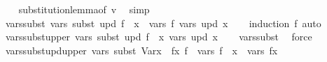 \begin{isabellebody}
%
\isadelimproof
\ \ %
\endisadelimproof
%
\isatagproof
{}\isamarkupfalse%
\ substitution{\isacharunderscore}{\kern0pt}lemma{\isacharbrackleft}{\kern0pt}of\ v{\isacharbrackright}{\kern0pt}\ \isamarkupfalse%
\ simp%
\endisatagproof
{\isafoldproof}%
%
\isadelimproof
\isanewline
%
\endisadelimproof
\isanewline
\isanewline
{}\isamarkupfalse%
\ vars{\isacharunderscore}{\kern0pt}subst{\isacharcolon}{\kern0pt}\ {\isachardoublequoteopen}vars\ {\isacharparenleft}{\kern0pt}subst\ upd\ f{\isacharparenright}{\kern0pt}\ {\isacharequal}{\kern0pt}\ {\isacharparenleft}{\kern0pt}{\isasymUnion}x\ {\isasymin}\ vars\ f{\isachardot}{\kern0pt}\ vars\ {\isacharparenleft}{\kern0pt}upd\ x{\isacharparenright}{\kern0pt}{\isacharparenright}{\kern0pt}{\isachardoublequoteclose}\isanewline
%
\isadelimproof
\ \ %
\endisadelimproof
%
\isatagproof
{}\isamarkupfalse%
\ {\isacharparenleft}{\kern0pt}induction\ f{\isacharparenright}{\kern0pt}\ auto%
\endisatagproof
{\isafoldproof}%
%
\isadelimproof
\isanewline
%
\endisadelimproof
\isanewline
{}\isamarkupfalse%
\ vars{\isacharunderscore}{\kern0pt}subst{\isacharunderscore}{\kern0pt}upper{\isacharcolon}{\kern0pt}\ {\isachardoublequoteopen}vars\ {\isacharparenleft}{\kern0pt}subst\ upd\ f{\isacharparenright}{\kern0pt}\ {\isasymsubseteq}\ {\isacharparenleft}{\kern0pt}{\isasymUnion}x{\isachardot}{\kern0pt}\ vars\ {\isacharparenleft}{\kern0pt}upd\ x{\isacharparenright}{\kern0pt}{\isacharparenright}{\kern0pt}{\isachardoublequoteclose}\isanewline
%
\isadelimproof
\ \ %
\endisadelimproof
%
\isatagproof
{}\isamarkupfalse%
\ vars{\isacharunderscore}{\kern0pt}subst\ \isamarkupfalse%
\ force%
\endisatagproof
{\isafoldproof}%
%
\isadelimproof
\isanewline
%
\endisadelimproof
\isanewline
\isanewline
{}\isamarkupfalse%
\ vars{\isacharunderscore}{\kern0pt}subst{\isacharunderscore}{\kern0pt}upd{\isacharunderscore}{\kern0pt}upper{\isacharcolon}{\kern0pt}\ {\isachardoublequoteopen}vars\ {\isacharparenleft}{\kern0pt}subst\ {\isacharparenleft}{\kern0pt}Var{\isacharparenleft}{\kern0pt}x\ {\isacharcolon}{\kern0pt}{\isacharequal}{\kern0pt}\ fx{\isacharparenright}{\kern0pt}{\isacharparenright}{\kern0pt}\ f{\isacharparenright}{\kern0pt}\ {\isasymsubseteq}\ vars\ f\ {\isacharminus}{\kern0pt}\ {\isacharbraceleft}{\kern0pt}x{\isacharbraceright}{\kern0pt}\ {\isasymunion}\ vars\ fx{\isachardoublequoteclose}\isanewline
%
\isadelimproof
%
\endisadelimproof
%
\isatagproof
{}\isamarkupfalse%
\isanewline
\ \ \isamarkupfalse%

\end{isabellebody}
